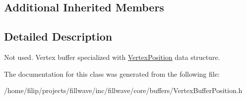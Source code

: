 \subsection*{Additional Inherited Members}


\subsection{Detailed Description}
Not used. Vertex buffer specialized with \hyperlink{structflw_1_1flc_1_1VertexPosition}{Vertex\+Position} data structure. 

The documentation for this class was generated from the following file\+:\begin{DoxyCompactItemize}
\item 
/home/filip/projects/fillwave/inc/fillwave/core/buffers/Vertex\+Buffer\+Position.\+h\end{DoxyCompactItemize}
